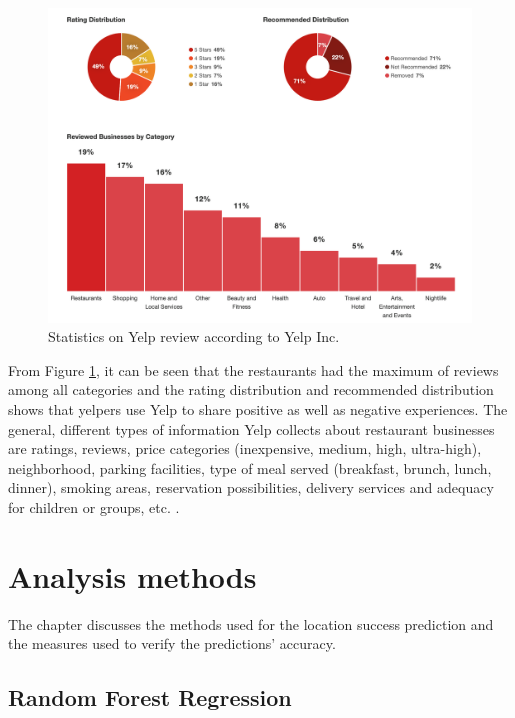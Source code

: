 \documentclass[a4paper, 11pt, oneside]{Thesis}  %
\begin{document}
\begin{figure}[h]
\includegraphics[scale=0.5]{Figures/Yelp_Factsheet_Figures.png}
\centering
\caption{Statistics on Yelp review according to Yelp Inc. \cite{YelpInc..2018}}
\label{fig:yelp_factsheet_figures}
\end{figure}

From Figure \ref{fig:yelp_factsheet_figures}, it can be seen that the restaurants had the maximum of reviews among all categories and the rating distribution and recommended distribution shows that yelpers use Yelp to share positive as well as negative experiences. The general, different types of information Yelp collects about restaurant businesses are ratings, reviews, price categories (inexpensive, medium, high, ultra-high), neighborhood, parking facilities, type of meal served (breakfast, brunch, lunch, dinner), smoking areas, reservation possibilities, delivery services and adequacy for children or groups, etc. \cite{YelpInc..2018}.  


 
 \chapter{Analysis methods}
 \label{Analysis_methods}

The chapter discusses the methods used for the location success prediction and the measures used to verify the predictions’ accuracy.

\section{Random Forest Regression}
\label{sec:random_forest_regression}
\end{document}
